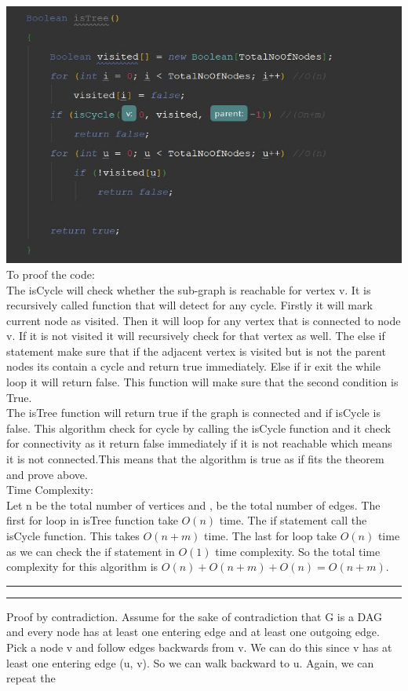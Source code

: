 \documentclass[a4paper, 11pt]{article}
\newcommand{\question}[2] {\vspace{.25in} \hrule\vspace{0.5em}
\noindent{\bf #1: #2} \vspace{0.5em}
\hrule \vspace{.10in}}
\begin{document}
\includegraphics[width=\textwidth]{isTree.jpg}\\
To proof the code:\\
The isCycle will check whether the sub-graph is reachable for vertex v. It is recursively called function that will detect for any cycle. Firstly it will mark current node as visited. Then it will loop for any vertex that is connected to node v. If it is not visited it will recursively check for that vertex as well. The else if statement make sure that if the adjacent vertex is visited but is not the parent nodes its contain a cycle and return true immediately. Else if ir exit the while loop it will return false. This function will make sure that the second condition is True.\\
The isTree function will return true if the graph is connected and if isCycle is false. This algorithm check for cycle by calling the isCycle function and it check for connectivity as it return false immediately if it is not reachable which means it is not connected.This means that the algorithm is true as if fits the theorem and prove above.\\
Time Complexity:\\
Let n be the total number of vertices and , be the total number of edges. The first for loop in isTree function take $O(n)$ time. The if statement call the isCycle function. This takes $O(n+m)$ time. The last for loop take $O(n)$ time as we can check the if statement in $O(1)$ time complexity. So the total time complexity for this algorithm is $O(n) + O(n+m) + O(n) = O(n+m)$.\\
\question{2}{Problem2}
Proof by contradiction. Assume for the sake of contradiction that G is a DAG and every node has at least one entering edge and at least one outgoing edge. Pick a node v and follow edges backwards from v. We can do this since v has at least one entering edge (u, v). So we can walk backward to u. Again, we can repeat the
\end{document}
